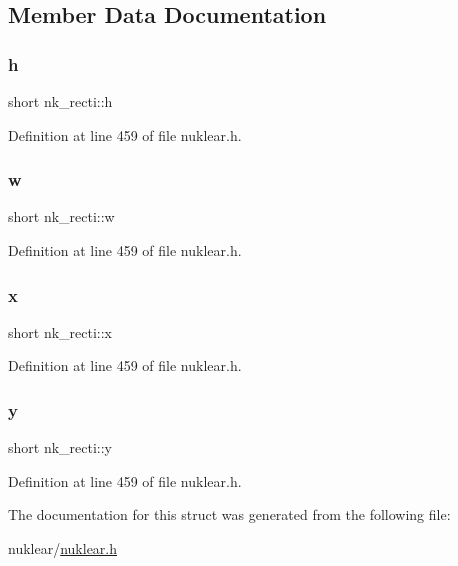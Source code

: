 \subsection{Member Data Documentation}
\mbox{\label{structnk__recti_a347aa6882ebcdc51a94bb80a049d302c}} 
\subsubsection{\texorpdfstring{h}{h}}
{\footnotesize\ttfamily short nk\+\_\+recti\+::h}



Definition at line 459 of file nuklear.\+h.

\mbox{\label{structnk__recti_a3ad6451540db2a5f50fa003a3a0ffbde}} 
\subsubsection{\texorpdfstring{w}{w}}
{\footnotesize\ttfamily short nk\+\_\+recti\+::w}



Definition at line 459 of file nuklear.\+h.

\mbox{\label{structnk__recti_a97e89bfa91f1359ad07e3d40a0f26082}} 
\subsubsection{\texorpdfstring{x}{x}}
{\footnotesize\ttfamily short nk\+\_\+recti\+::x}



Definition at line 459 of file nuklear.\+h.

\mbox{\label{structnk__recti_a59bdabc718f54615256de8026399a518}} 
\subsubsection{\texorpdfstring{y}{y}}
{\footnotesize\ttfamily short nk\+\_\+recti\+::y}



Definition at line 459 of file nuklear.\+h.



The documentation for this struct was generated from the following file\+:\begin{DoxyCompactItemize}
\item 
nuklear/\mbox{\hyperlink{nuklear_8h}{nuklear.\+h}}\end{DoxyCompactItemize}
